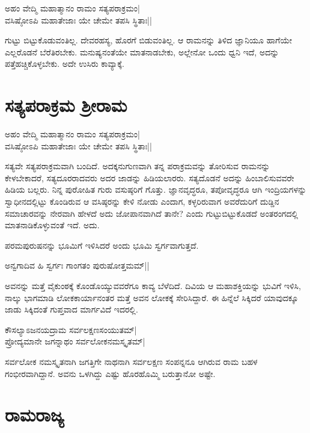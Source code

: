 \begin{shloka}
ಅಹಂ ವೇದ್ಮಿ ಮಹಾತ್ಮಾನಂ ರಾಮಂ ಸತ್ಯಪರಾಕ್ರಮಂ|\label{251}\\
ವಸಿಷ್ಠೋಽಪಿ ಮಹಾತೇಜಾಃ ಯೇ ಚೇಮೇ ತಪಸಿ ಸ್ಥಿತಾಃ||
\end{shloka}

ಗುಟ್ಟು ಬಿಟ್ಟುಕೊಡುವಂತಿಲ್ಲ. ದೇವರಹಸ್ಯ, ಹೊರಗೆ ಬಿಡುವಂತಿಲ್ಲ. ಆ ರಾಮನನ್ನು ತಿಳಿದ ಜ್ಞಾನಿಯೂ ಹಾಗೆಯೇ ಎಲ್ಲರೊಡನೆ ಬೆರೆತಿರಬೇಕು. ಮನುಷ್ಯನಂತೆಯೇ ಮಾತನಾಡಬೇಕು, ಅಲ್ಲೇನೋ ಒಂದು ಧ್ವನಿ ಇದೆ, ಅದನ್ನು ಪತ್ತೆಹಚ್ಚಿಕೊಳ್ಳಬೇಕು. ಅದೇ ಉಸಿರು ಕಾವ್ಯಾಕ್ಕೆ. 

\section*{ಸತ್ಯಪರಾಕ್ರಮ ಶ್ರೀರಾಮ}

\begin{shloka}
ಅಹಂ ವೇದ್ಮಿ ಮಹಾತ್ಮಾನಂ ರಾಮಂ ಸತ್ಯಪರಾಕ್ರಮಂ|\\
ವಸಿಷ್ಠೋಽಪಿ ಮಹಾತೇಜಾಃ ಯೇ ಚೇಮೇ ತಪಸಿ ಸ್ಥಿತಾಃ||
\end{shloka}

ಸತ್ಯವೇ ಸತ್ಯಪರಾಕ್ರಮವಾಗಿ ಬಂದಿದೆ. ಅದಕ್ಕನುಗುಣವಾಗಿ ತನ್ನ ಪರಾಕ್ರಮವನ್ನು ತೋರಿಸುವ ರಾಮನನ್ನು ಕೇಳಬೇಕಾದರೆ, ಸತ್ಯದೂರರಾದವರು ಅದರ ಜಾಡನ್ನು ಹಿಡಿಯಲಾರರು. ಸತ್ಯದೊಡನೆ ಅದನ್ನು ಹಿಂಬಾಲಿಸುವವರೇ ಹಿಡಿಯ ಬಲ್ಲರು. ನಿನ್ನ ಪುರೋಹಿತ ಗುರು ವಸುಷ್ಠರಿಗೆ ಗೊತ್ತು. ಜ್ಞಾನವೃದ್ಧರೂ, ತಪೋವೃದ್ಧರೂ ಆಗಿ ಇಂದ್ರಿಯಗಳನ್ನು ಸ್ವಾಧೀನದಲ್ಲಿಟ್ಟು ಕೊಂಡಿರುವ ಆ ವಸಿಷ್ಠರನ್ನು ಕೇಳಿ ನೋಡು ಎಂದಾಗ, ಕಳ್ಳರಿರುವಾಗ ಅವರೆದುರಿಗೆ ದುಡ್ಡಿನ ಸಮಾಚಾರವನ್ನು ನೇರವಾಗಿ ಹೇಳದೆ ಅದು ಜೋಪಾನವಾಗಿದೆ ತಾನೇ? ಎಂದು ಗುಟ್ಟುಬಿಟ್ಟುಕೊಡದೆ ಅಂತರಂಗದಲ್ಲಿ ಮಾತನಾಡಿಕೊಳ್ಳುವಂತೆ ಇದೆ. ಅದು. 

ಪರಮಪುರುಷನನ್ನು ಭೂಮಿಗೆ ಇಳಿಸಿದರೆ ಅಂದು ಭೂಮಿ ಸ್ವರ್ಗವಾಗುತ್ತದೆ. 

\begin{shloka}
ಅನ್ವಗಾದಿವ ಹಿ ಸ್ವರ್ಗಃ ಗಾಂಗತಂ ಪುರುಷೋತ್ತಮಮ್||
\end{shloka}

ಅವನನ್ನು ಮತ್ತೆ ವೈಕುಂಠಕ್ಕೆ ಕೊಂಡೊಯ್ಯುವವರೆಗೂ ಕಾವ್ಯ ಬೆಳೆದಿದೆ. ದಿವಿಯ ಆ ಮಹಾಶಕ್ತಿಯನ್ನು ಭುವಿಗೆ ಇಳಿಸಿ, ನಾಲ್ಕು ಭಾಗಮಾಡಿ ಲೋಕಕಾರ್ಯಾನಂತರ ಮತ್ತೆ ಅವನ ಲೋಕಕ್ಕೆ ಸೇರಿಸಿದ್ದಾರೆ. ಈ ಹಿನ್ನೆಲೆ ಸಿಕ್ಕಿದರೆ ಯಾವುದಕ್ಕೂ ಜಾಡು ಸಿಕ್ಕಿದಂತೆ ಗುಪ್ತವಾದ ಮಾರ್ಗವಿದೆ ಇದರಲ್ಲಿ. 

\begin{shloka}
ಕೌಸಲ್ಯಾಽಜನಯದ್ರಾಮ‌ ಸರ್ವಲಕ್ಷಣಸಂಯುತಮ್|\label{252}\\
ಪ್ರೋದ್ಯಮಾನೇ ಜಗನ್ನಾಥಂ ಸರ್ವಲೋಕನಮಸ್ಕೃತಮ್|
\end{shloka}

ಸರ್ವಲೋಕ ನಮಸ್ಕೃತನಾಗಿ ಜಗತ್ತಿಗೇ ನಾಥನಾಗಿ ಸರ್ವಲಕ್ಷಣ ಸಂಪನ್ನನೂ ಆಗಿರುವ ರಾಮ ಬಹಳ ಗಂಭೀರವಾಗಿದ್ದಾನೆ. ಅವನು ಒಳಗಿದ್ದು ಎಷ್ಟು ಹೊರಹೊಮ್ಮಿ ಬರುತ್ತಾನೋ ಅಷ್ಟೇ. 

\section*{ರಾಮರಾಜ್ಯ}

